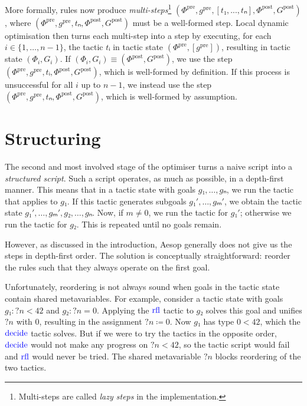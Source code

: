 \documentclass[sigplan,screen]{acmart}
\newcommand{\tac}[1]{\ensuremath{\mathrm{\mathcolor{blue}{#1}}}}
\newcommand{\mvar}[1]{{?#1}}
\newcommand{\pre}{\mathrm{pre}}
\newcommand{\post}{\mathrm{post}}
\newcommand{\step}[5]{\ensuremath{(#1,\allowbreak #2,\allowbreak #3,\allowbreak #4,\allowbreak #5)}}
\begin{document}
More formally, rules now produce \emph{multi-steps}\footnote{Multi-steps are called \emph{lazy steps} in the implementation.} $\step{Φ^{\pre}}{g^{\pre}}{[t₁, ..., tₙ]}{Φ^{\post}}{G^{\post}}$, where $\step{Φ^{\pre}}{g^{\pre}}{tₙ}{Φ^{\post}}{G^{\post}}$ must be a well-formed step.
Local dynamic optimisation then turns each multi-step into a step by executing, for each $i ∈ \{1, \dots, n-1\}$, the tactic $tᵢ$ in tactic state $(Φ^{\pre}, [g^{\pre}])$, resulting in tactic state $(Φ_{i}, G_{i})$.
If $(Φ_{i}, G_{i}) ≡ (Φ^{\post}, G^{\post})$, we use the step $(Φ^{\pre}, g^{\pre}, tᵢ, Φ^{\post}, G^{\post})$, which is well-formed by definition.
If this process is unsuccessful for all $i$ up to $n-1$, we instead use the step $(Φ^{\pre}, g^{\pre}, tₙ, Φ^{\post}, G^{\post})$, which is well-formed by assumption.

\section{Structuring}%
\label{sec:structuring}

The second and most involved stage of the optimiser turns a naive script into a \emph{structured script}.
Such a script operates, as much as possible, in a depth-first manner.
This means that in a tactic state with goals $g₁, \dots, gₙ$, we run the tactic that applies to $g₁$.
If this tactic generates subgoals $g₁', \dots, gₘ'$, we obtain the tactic state $g₁', \dots, gₘ', g₂, \dots, gₙ$.
Now, if $m ≠ 0$, we run the tactic for $g₁'$; otherwise we run the tactic for $g₂$.
This is repeated until no goals remain.

However, as discussed in the introduction, Aesop generally does not give us the steps in depth-first order.
The solution is conceptually straightforward: reorder the rules such that they always operate on the first goal.

Unfortunately, reordering is not always sound when goals in the tactic state contain shared metavariables.
For example, consider a tactic state with goals $g₁ : \mvar{n} < 42$ and $g₂ : \mvar{n} = 0$.
Applying the \tac{rfl} tactic to $g₂$ solves this goal and unifies $\mvar{n}$ with $0$, resulting in the assignment $\mvar{n} ≔ 0$.
Now $g₁$ has type $0 < 42$, which the \tac{decide} tactic solves.
But if we were to try the tactics in the opposite order, \tac{decide} would not make any progress on $\mvar{n} < 42$, so the tactic script would fail and \tac{rfl} would never be tried.
The shared metavariable $\mvar{n}$ blocks reordering of the two tactics.
\end{document}
